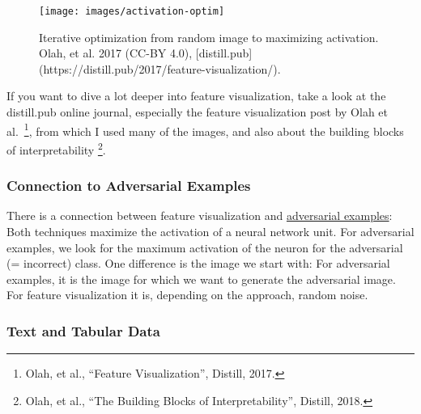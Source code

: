 \documentclass[
  12pt,
]{krantz}
\begin{document}
\begin{figure}

{\centering \texttt{[image: images/activation-optim]} 

}

\caption{Iterative optimization from random image to maximizing activation. Olah, et al. 2017 (CC-BY 4.0), [distill.pub](https://distill.pub/2017/feature-visualization/).}\label{fig:activation-optim}
\end{figure}

If you want to dive a lot deeper into feature visualization, take a look at the distill.pub online journal, especially the feature visualization post by Olah et al.~\footnote{Olah, et al., ``Feature Visualization'', Distill, 2017.}, from which I used many of the images, and also about the building blocks of interpretability \footnote{Olah, et al., ``The Building Blocks of Interpretability'', Distill, 2018.}.

\hypertarget{connection-to-adversarial-examples}{%
\subsubsection{Connection to Adversarial Examples}\label{connection-to-adversarial-examples}}

There is a connection between feature visualization and \protect\hyperlink{adversarial}{adversarial examples}:
Both techniques maximize the activation of a neural network unit.
For adversarial examples, we look for the maximum activation of the neuron for the adversarial (= incorrect) class.
One difference is the image we start with:
For adversarial examples, it is the image for which we want to generate the adversarial image.
For feature visualization it is, depending on the approach, random noise.

\hypertarget{text-and-tabular-data}{%
\subsubsection{Text and Tabular Data}\label{text-and-tabular-data}}
\end{document}
